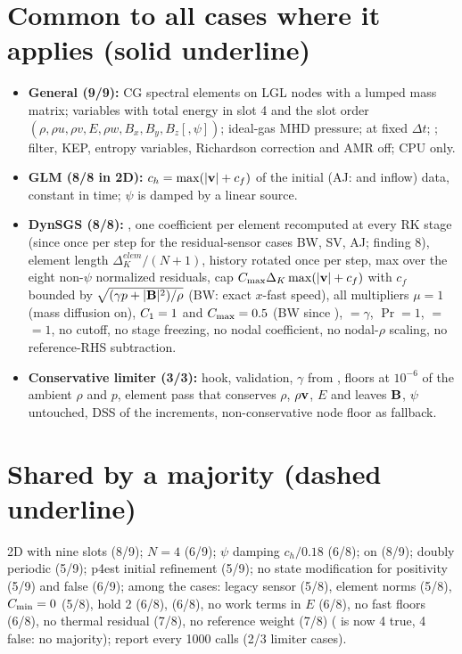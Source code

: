 \documentclass[10pt]{article}
\begin{document}
\section*{Common to all cases where it applies (solid underline)}
\begin{itemize}[leftmargin=*]
\item \textbf{General (9/9):} CG spectral elements on LGL nodes with a lumped mass matrix;  variables
with total energy in slot 4 and the slot order $(\rho,\rho u,\rho v,E,\rho w,B_x,B_y,B_z[,\psi])$; ideal-gas MHD
pressure;  at fixed $\Delta t$; ; filter, KEP, entropy variables,
Richardson correction and AMR off; CPU only.
\item \textbf{GLM (8/8 in 2D):} $c_h=\max(|\mathbf{v}|+c_f)$ of the initial (AJ: and inflow) data, constant in time; $\psi$ is
damped by a linear source.
\item \textbf{DynSGS (8/8):} , one coefficient per element recomputed at every RK stage (since  once per step for the residual-sensor cases BW, SV, AJ; finding 8), element
length $\Delta^{elem}_K/(N+1)$, history rotated once per step, max over the eight non-$\psi$ normalized residuals,
cap $C_{\max}\Delta_K\max(|\mathbf{v}|+c_f)$ with $c_f$ bounded by $\sqrt{(\gamma p+|\mathbf{B}|^2)/\rho}$ (BW: exact $x$-fast speed),
all multipliers $\mu=1$ (mass diffusion on), $C_1=1$ and $C_{\max}=0.5$ (BW since ),
 $=\gamma$, $\Pr=1$,  $=$
 $=1$, no cutoff, no stage freezing, no nodal coefficient, no nodal-$\rho$ scaling, no
reference-RHS subtraction.
\item \textbf{Conservative limiter (3/3):} hook, validation, $\gamma$ from , floors at $10^{-6}$ of the
ambient $\rho$ and $p$, element pass that conserves $\rho$, $\rho\mathbf{v}$, $E$ and leaves $\mathbf{B}$, $\psi$ untouched, DSS of the
increments, non-conservative node floor as fallback.
\end{itemize}

\section*{Shared by a majority (dashed underline)}
2D with nine slots (8/9); $N=4$ (6/9); $\psi$ damping $c_h/0.18$ (6/8);  on (8/9); doubly periodic (5/9);
p4est initial refinement (5/9); no state modification for positivity (5/9) and  false (6/9);
among the \dsgs{} cases: legacy sensor (5/8), element norms (5/8), $C_{\min}=0$ (5/8),
hold 2 (6/8),  (6/8), no work terms in $E$ (6/8), no fast floors (6/8), no thermal residual
(7/8), no reference weight (7/8) ( is now 4 true, 4 false: no majority); report every 1000 calls (2/3 limiter cases).
\end{document}
